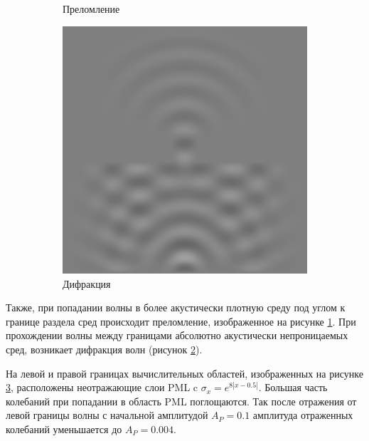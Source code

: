 \documentclass[a4paper, fontsize=14pt]{article}
\begin{document}
\begin{figure}[h]
\begin{subfigure}{0.3\textwidth}
		\caption{Преломление}
		\label{wrefr}
	\end{subfigure}
	\begin{subfigure}{0.3\textwidth}
		\centering
		\includegraphics[width=\textwidth]{difr.eps}
		\caption{Дифракция}
		\label{wdifr}
	\end{subfigure}
    \caption{}
    \label{wphenomena}
\end{figure}

Также, при попадании волны в более акустически плотную среду под углом к границе раздела сред происходит
преломление, изображенное на рисунке \ref{wrefr}. При прохождении волны между границами абсолютно
акустически непроницаемых сред, возникает дифракция волн (рисунок \ref{wdifr}). 

На левой и правой границах вычислительных областей, изображенных на рисунке \ref{wphenomena}, 
расположены неотражающие слои PML c $\sigma_x = e^{8 |x-0.5|}$. Большая часть колебаний при попадании в область PML поглощаются.
Так после отражения от левой границы волны с начальной амплитудой $A_P = 0.1$ амплитуда отраженных
колебаний уменьшается до  $A_P = 0.004$.
\end{document}
